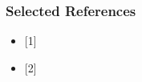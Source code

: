 \documentclass{beamer}
\begin{document}
\begin{frame}
\frametitle{Selected References}
\begin{itemize}
    \item \footnotesize{[1]
        }
    \item \footnotesize{[2]
    }
    
\end{itemize}

\end{frame}


\end{document}
